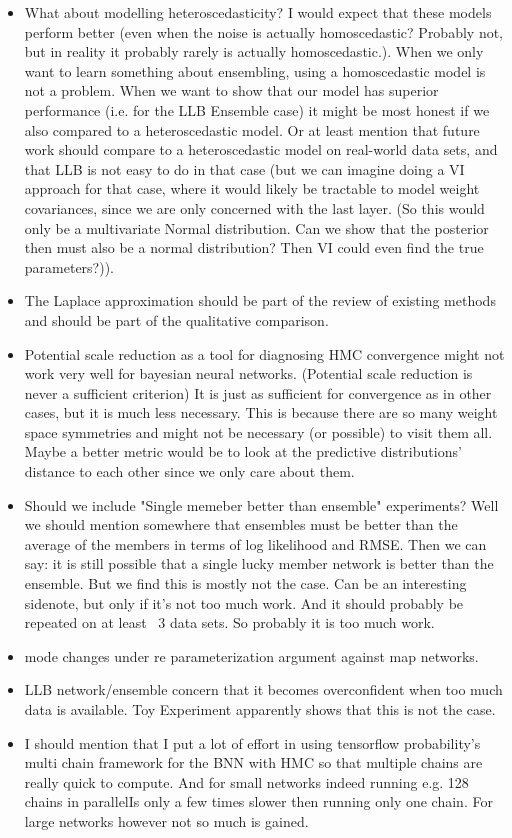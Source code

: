 \documentclass[12pt, A4, twoside]{report}
\begin{document}
\begin{itemize}
  \item What about modelling heteroscedasticity? I would expect that these models perform better (even when the noise is actually homoscedastic? Probably not, but in reality it probably rarely is actually homoscedastic.). When we only want to learn something about ensembling, using a homoscedastic model is not a problem. When we want to show that our model has superior performance (i.e. for the LLB Ensemble case) it might be most honest if we also compared to a heteroscedastic model. Or at least mention that future work should compare to a heteroscedastic model on real-world data sets, and that LLB is not easy to do in that case (but we can imagine doing a VI approach for that case, where it would likely be tractable to model weight covariances, since we are only concerned with the last layer. (So this would only be a multivariate Normal distribution. Can we show that the posterior then must also be a normal distribution? Then VI could even find the true parameters?)). 
  \item The Laplace approximation should be part of the review of existing methods and should be part of the qualitative comparison. 
  \item Potential scale reduction as a tool for diagnosing HMC convergence might not work very well for bayesian neural networks. (Potential scale reduction is never a sufficient criterion) It is just as sufficient for convergence as in other cases, but it is much less necessary. This is because there are so many weight space symmetries and might not be necessary (or possible) to visit them all. Maybe a better metric would be to look at the predictive distributions' distance to each other since we only care about them.
  \item Should we include "Single memeber better than ensemble" experiments? Well we should mention somewhere that ensembles must be better than the average of the members in terms of log likelihood and RMSE. Then we can say: it is still possible that a single lucky member network is better than the ensemble. But we find this is mostly not the case. Can be an interesting sidenote, but only if it's not too much work. And it should probably be repeated on at least ~3 data sets. So probably it is too much work.
  \item mode changes under re parameterization argument against map networks.
  \item LLB network/ensemble concern that it becomes overconfident when too much data is available. Toy Experiment apparently shows that this is not the case.
  \item I should mention that I put a lot of effort in using tensorflow probability's multi chain framework for the BNN with HMC so that multiple chains are really quick to compute. And for small networks indeed running e.g. 128 chains in parallelIs only a few times slower then running only one chain.  For large networks however not so much is gained. \cite{lao2020tfp}
\end{itemize}
\printbibliography
\end{document}
